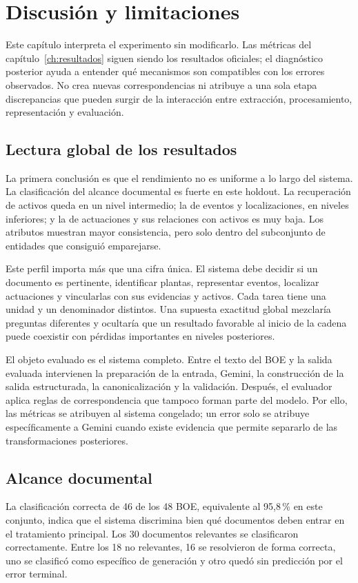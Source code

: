 \chapter{Discusión y limitaciones}
\label{ch:discusion}

Este capítulo interpreta el experimento sin modificarlo. Las métricas del
capítulo~\ref{ch:resultados} siguen siendo los resultados oficiales; el
diagnóstico posterior ayuda a entender qué mecanismos son compatibles con los
errores observados. No crea nuevas correspondencias ni atribuye a una sola
etapa discrepancias que pueden surgir de la interacción entre extracción,
procesamiento, representación y evaluación.

\section{Lectura global de los resultados}
La primera conclusión es que el rendimiento no es uniforme a lo largo del
sistema. La clasificación del alcance documental es fuerte en este holdout.
La recuperación de activos queda en un nivel intermedio; la de eventos y
localizaciones, en niveles inferiores; y la de actuaciones y sus relaciones
con activos es muy baja. Los atributos muestran mayor consistencia, pero solo
dentro del subconjunto de entidades que consiguió emparejarse.

Este perfil importa más que una cifra única. El sistema debe decidir si un
documento es pertinente, identificar plantas, representar eventos, localizar
actuaciones y vincularlas con sus evidencias y activos. Cada tarea tiene una
unidad y un denominador distintos. Una supuesta exactitud global mezclaría
preguntas diferentes y ocultaría que un resultado favorable al inicio de la
cadena puede coexistir con pérdidas importantes en niveles posteriores.

El objeto evaluado es el sistema completo. Entre el texto del BOE y la salida
evaluada intervienen la preparación de la entrada, Gemini, la construcción de
la salida estructurada, la canonicalización y la validación. Después, el
evaluador aplica reglas de correspondencia que tampoco forman parte del
modelo. Por ello, las métricas se atribuyen al sistema congelado; un error solo
se atribuye específicamente a Gemini cuando existe evidencia que permite
separarlo de las transformaciones posteriores.

\section{Alcance documental}
La clasificación correcta de 46 de los 48 BOE, equivalente al 95,8\,\% en
este conjunto, indica que el sistema discrimina bien qué documentos deben
entrar en el tratamiento principal. Los 30 documentos relevantes se
clasificaron correctamente. Entre los 18 no relevantes, 16 se resolvieron de
forma correcta, uno se clasificó como específico de generación y otro quedó
sin predicción por el error terminal.

